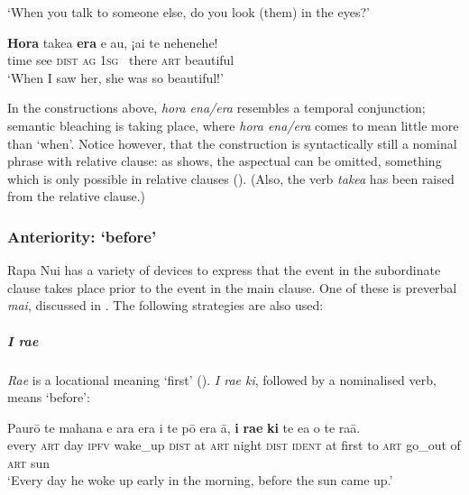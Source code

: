 \glt 
‘When you talk to someone else, do you look (them) in the eyes?’ \textstyleExampleref{[R209.027]} 
\z

\ea\label{ex:11.233}
\gll \textbf{Hora} take{\ꞌ}a \textbf{era} e au, ¡{\ꞌ}ai te nehenehe!\\
time see \textsc{dist} \textsc{ag} \textsc{1sg} ~there \textsc{art} beautiful\\

\glt
‘When I saw her, she was so beautiful!’ \textstyleExampleref{[R413.099]} 
\z

In the constructions above, \textit{hora ena/era} resembles a temporal conjunction; semantic bleaching is taking place, where \textit{hora ena/era} comes to mean little more than ‘when’. Notice however, that the construction is syntactically still a nominal phrase with relative clause: as  shows, the aspectual can be omitted, something which is only possible in relative clauses (). (Also, the verb \textit{take{\ꞌ}a} has been raised from the relative clause.)

\subsubsection{Anteriority: ‘before’}\label{sec:11.6.2.4}

Rapa Nui has a variety of devices to express that the event in the subordinate clause takes place prior to the event in the main clause. One of these is preverbal \textit{mai}, discussed in . The following strategies are also used:

\subparagraph{\textit{{\ꞌ}I ra{\ꞌ}e}} \textit{Ra{\ꞌ}e} is a locational meaning ‘first’ (). \textit{{\ꞌ}I ra{\ꞌ}e ki}, followed by a nominalised verb, means ‘before’:

\ea\label{ex:11.234}
\gll Paurō te mahana e {\ꞌ}ara era {\ꞌ}i te pō era {\ꞌ}ā, \textbf{{\ꞌ}i} \textbf{ra{\ꞌ}e} \textbf{ki} te e{\ꞌ}a  o te ra{\ꞌ}ā.\\
every \textsc{art} day \textsc{ipfv} wake\_up \textsc{dist} at \textsc{art} night \textsc{dist} \textsc{ident} at first to \textsc{art} go\_out  of \textsc{art} sun\\

\glt 
‘Every day he woke up early in the morning, before the sun came up.’ \textstyleExampleref{[R448.003]} 
\z


